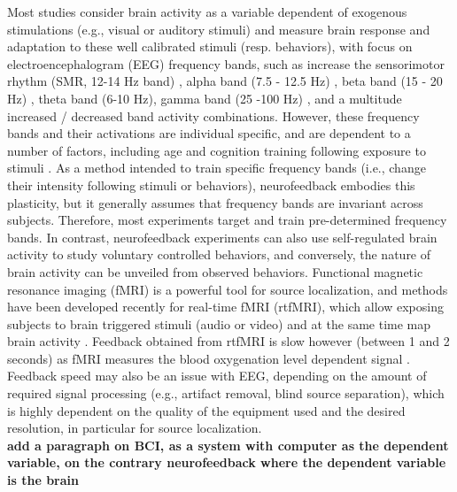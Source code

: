 Most studies consider brain activity as a variable dependent of exogenous stimulations  (e.g., visual or auditory stimuli) and measure brain response and adaptation to these well calibrated stimuli (resp. behaviors), with focus on electroencephalogram (EEG) frequency bands, such as increase the sensorimotor rhythm (SMR, 12-14 Hz band) \cite{}, alpha band (7.5 - 12.5 Hz) \cite{}, beta band (15 - 20 Hz) \cite{}, theta band (6-10 Hz), gamma band (25 -100 Hz) \cite{}, and a multitude increased / decreased band activity combinations. However, these frequency bands and their activations are individual specific, and are dependent to a number of factors, including age \cite{} and cognition training following exposure to stimuli \cite{}. As a method intended to train specific frequency bands (i.e., change their intensity following stimuli or behaviors), neurofeedback embodies this plasticity, but it generally assumes that frequency bands are invariant across subjects. Therefore, most experiments target and train pre-determined frequency bands. In contrast, neurofeedback experiments can also use self-regulated brain activity to study voluntary controlled behaviors, and conversely, the nature of brain activity can be unveiled from observed behaviors. Functional magnetic resonance imaging (fMRI) is a powerful tool for source localization, and methods have been developed recently for real-time fMRI (rtfMRI), which allow exposing subjects to brain triggered stimuli (audio or video) and at the same time map brain activity \cite{}. Feedback obtained from rtfMRI is slow however (between 1 and 2 seconds) as fMRI measures the blood oxygenation level dependent signal \cite{ogawa1990brain,ogawa1990oxygenation}. Feedback speed may also be an issue with EEG, depending on the amount of required signal processing (e.g., artifact removal, blind source separation), which is highly dependent on the quality of the equipment used and the desired resolution, in particular for source localization.\\

{\bf add a paragraph on BCI, as a system with computer as the dependent variable, on the contrary neurofeedback where the dependent variable is the brain}


